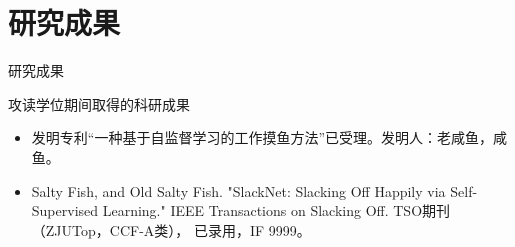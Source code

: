 
\section*{研究成果}
\label{sec:achievements}

\begin{frame}{研究成果}
  \begin{block}{攻读学位期间取得的科研成果}
    \begin{itemize}
      \item 发明专利“一种基于自监督学习的工作摸鱼方法”已受理。发明人：老咸鱼，咸鱼。
      \item Salty Fish, and Old Salty Fish. "SlackNet: Slacking Off Happily via Self-Supervised Learning." IEEE Transactions on Slacking Off. TSO期刊（ZJUTop，CCF-A类）， 已录用，IF 9999。
    \end{itemize}
  \end{block}
\end{frame}
